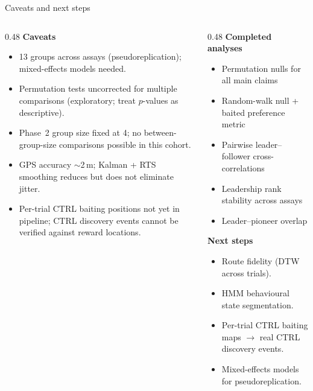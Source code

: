 \documentclass[aspectratio=169, 10pt]{beamer}
\begin{document}
\begin{frame}{Caveats and next steps}
\begin{columns}[T]
\begin{column}{0.48\textwidth}
\textbf{Caveats}
\begin{itemize}\setlength\itemsep{0.12em}
    \item 13 groups across assays (pseudoreplication);
          mixed-effects models needed.
    \item Permutation tests uncorrected for multiple comparisons
          (exploratory; treat $p$-values as descriptive).
    \item Phase~2 group size fixed at 4; no between-group-size
          comparisons possible in this cohort.
    \item GPS accuracy $\sim$2\,m; Kalman + RTS smoothing reduces but
          does not eliminate jitter.
    \item Per-trial CTRL baiting positions not yet in pipeline;
          CTRL discovery events cannot be verified against reward locations.
\end{itemize}
\end{column}
\begin{column}{0.48\textwidth}
\textbf{Completed analyses}
\begin{itemize}\setlength\itemsep{0.08em}
    \item Permutation nulls for all main claims
    \item Random-walk null + baited preference metric
    \item Pairwise leader--follower cross-correlations
    \item Leadership rank stability across assays
    \item Leader--pioneer overlap
\end{itemize}

\vspace{0.3em}
\textbf{Next steps}
\begin{itemize}\setlength\itemsep{0.08em}
    \item Route fidelity (DTW across trials).
    \item HMM behavioural state segmentation.
    \item Per-trial CTRL baiting maps $\to$ real CTRL
          discovery events.
    \item Mixed-effects models for pseudoreplication.
\end{itemize}
\end{column}
\end{columns}
\end{frame}
\end{document}
